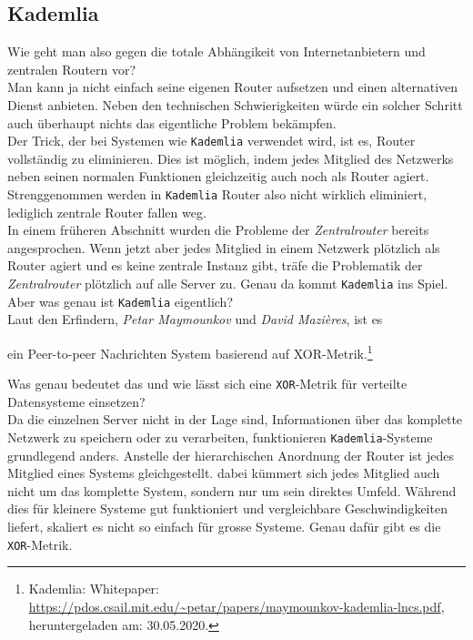 \documentclass[11pt]{article}
\begin{document}
\subsection{Kademlia}
\label{sec:orgfa57e18}
Wie geht man also gegen die totale Abhängikeit von Internetanbietern
und zentralen Routern vor?\\
Man kann ja nicht einfach seine eigenen Router aufsetzen und einen
alternativen Dienst anbieten. Neben den technischen Schwierigkeiten
würde ein solcher Schritt auch überhaupt nichts das eigentliche
Problem bekämpfen.\\

\noindent Der Trick, der bei Systemen wie \texttt{Kademlia} verwendet wird, ist
es, Router vollständig zu eliminieren. Dies ist möglich, indem jedes
Mitglied des Netzwerks neben seinen normalen Funktionen gleichzeitig
auch noch als Router agiert. Strenggenommen werden in \texttt{Kademlia} Router
also nicht wirklich eliminiert, lediglich zentrale Router fallen
weg.\\

\noindent In einem früheren Abschnitt wurden die Probleme der
\emph{Zentralrouter} bereits angesprochen. Wenn jetzt aber jedes Mitglied in
einem Netzwerk plötzlich als Router agiert und es keine zentrale
Instanz gibt, träfe die Problematik der \emph{Zentralrouter} plötzlich auf
alle Server zu. Genau da kommt \texttt{Kademlia} ins Spiel. Aber was genau ist
\texttt{Kademlia} eigentlich?\\

\noindent Laut den Erfindern, \emph{Petar Maymounkov} und \emph{David Mazières},
ist es
\begin{center}
ein Peer-to-peer Nachrichten System basierend auf XOR-Metrik.\footnote{Kademlia: Whitepaper:
\url{https://pdos.csail.mit.edu/\~petar/papers/maymounkov-kademlia-lncs.pdf},
heruntergeladen am: 30.05.2020.}
\end{center}
Was genau bedeutet das und wie lässt sich eine \texttt{XOR}-Metrik für
verteilte Datensysteme einsetzen?\\

\noindent Da die einzelnen Server nicht in der Lage sind,
Informationen über das komplette Netzwerk zu speichern oder zu
verarbeiten, funktionieren \texttt{Kademlia}-Systeme grundlegend anders.
Anstelle der hierarchischen Anordnung der Router ist jedes Mitglied
eines Systems gleichgestellt. dabei kümmert sich jedes Mitglied auch
nicht um das komplette System, sondern nur um sein direktes Umfeld.
Während dies für kleinere Systeme gut funktioniert und vergleichbare
Geschwindigkeiten liefert, skaliert es nicht so einfach für grosse
Systeme. Genau dafür gibt es die \texttt{XOR}-Metrik.
\end{document}
